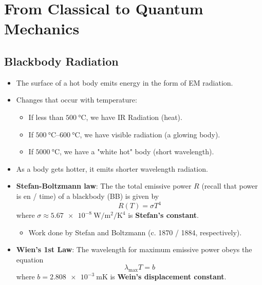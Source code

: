 \documentclass[../notes.tex]{subfiles}
\begin{document}
\chapter{From Classical to Quantum Mechanics}
\section{Blackbody Radiation}
\begin{itemize}
    \item {}The surface of a hot body emits energy in the form of EM radiation.
    \item Changes that occur with temperature:
    \begin{itemize}
        \item If less than $\SI{500}{\celsius}$, we have IR Radiation (heat).
        \item If $\SIrange{500}{600}{\celsius}$, we have visible radiation (a glowing body).
        \item If $\SI{5000}{\celsius}$, we have a "white hot" body (short wavelength).
    \end{itemize}
    \item As a body gets hotter, it emits shorter wavelength radiation.
    \item \textbf{Stefan-Boltzmann law}: The the total emissive power $R$ (recall that power is en / time) of a blackbody (BB) is given by
    \begin{equation*}
        R(T) = \sigma T^4
    \end{equation*}
    where $\sigma\approx\SI{5.67e-8}{\watt\per\square\meter\per\kelvin\tothe{4}}$ is \textbf{Stefan's constant}.
    \begin{itemize}
        \item Work done by Stefan and Boltzmann (c. 1870 / 1884, respectively).
    \end{itemize}
    \item \textbf{Wien's 1st Law}: The wavelength for maximum emissive power obeys the equation
    \begin{equation*}
        \lambda_\text{max}T = b
    \end{equation*}
    where $b=\SI{2.808e-3}{\meter\kelvin}$ is \textbf{Wein's displacement constant}.
    \begin{figure}[h!]
        \centering
\end{figure}
\end{itemize}
\end{document}
